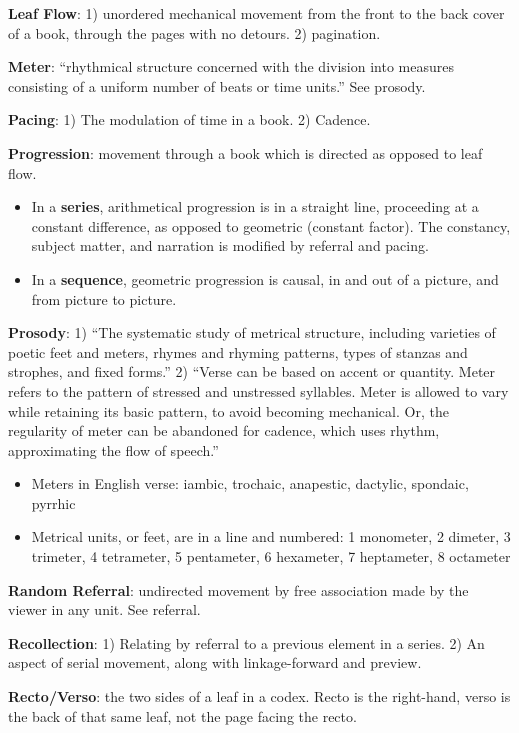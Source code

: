 \documentclass[12pt]{extarticle}
\begin{document}
\textbf{Leaf Flow}: 1) unordered mechanical movement from the front to the back cover of a book, through the pages with no detours. 2) pagination.

\textbf{Meter}: ``rhythmical structure concerned with the division into measures consisting of a uniform number of beats or time units.'' See prosody.

\textbf{Pacing}: 1) The modulation of time in a book. 2) Cadence.

\textbf{Progression}: movement through a book which is directed as opposed to leaf flow.
\begin{itemize}
  \item In a \textbf{series}, arithmetical progression is in a straight line, proceeding at a constant difference, as opposed to geometric (constant factor). The constancy, subject matter, and narration is modified by referral and pacing.
  \item In a \textbf{sequence}, geometric progression is causal, in and out of a picture, and from picture to picture.
\end{itemize}

\textbf{Prosody}: 1) ``The systematic study of metrical structure, including varieties of poetic feet and meters, rhymes and rhyming patterns, types of stanzas and strophes, and fixed forms.'' 2) ``Verse can be based on accent or quantity. Meter refers to the pattern of stressed and unstressed syllables. Meter is allowed to vary while retaining its basic pattern, to avoid becoming mechanical. Or, the regularity of meter can be abandoned for cadence, which uses rhythm, approximating the flow of speech.''
\begin{itemize}
  \item Meters in English verse: iambic, trochaic, anapestic, dactylic, spondaic, pyrrhic
  \item Metrical units, or feet, are in a line and numbered: 1 monometer, 2 dimeter, 3 trimeter, 4 tetrameter, 5 pentameter, 6 hexameter, 7 heptameter, 8 octameter
\end{itemize}

\textbf{Random Referral}: undirected movement by free association made by the viewer in any unit. See referral.

\textbf{Recollection}: 1) Relating by referral to a previous element in a series. 2) An aspect of serial movement, along with linkage-forward and preview.

\textbf{Recto/Verso}: the two sides of a leaf in a codex. Recto is the right-hand, verso is the back of that same leaf, not the page facing the recto.
\end{document}
